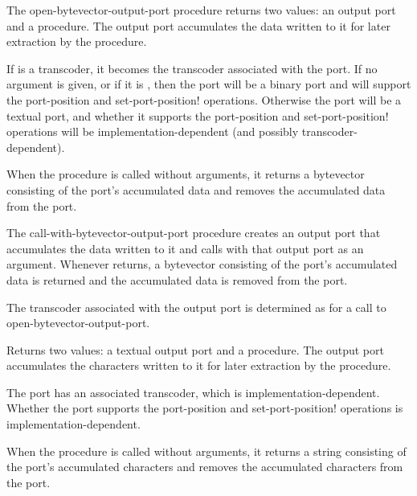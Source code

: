 \begin{entry}{%
}


The {\cf open-bytevector-output-port} procedure returns 
two values: an output port and a procedure.
The output port accumulates the data written to it for
later extraction by the procedure.

If  is a transcoder, it becomes
the transcoder associated with the port.
If no  argument is given, or
if it is \schfalse,
then the port will be a binary port and will support the
{\cf port-position} and {\cf set-port-position!}  operations.
Otherwise the port will be a textual port, and whether it supports
the {\cf port-position} and {\cf set-port-position!} operations
will be implementation-dependent (and possibly transcoder-dependent).

When the procedure is called without arguments, it returns a bytevector consisting of the
port's accumulated data and removes the accumulated data from the port.
\end{entry}

\begin{entry}{%
}


The {\cf call-with-bytevector-output-port} procedure creates an output
port that accumulates the data written to it and calls  with
that output port as an argument. Whenever  returns, a
bytevector consisting of the port's accumulated data is returned and
the accumulated data is removed from the port.

The transcoder associated with the output port is determined
as for a call to {\cf open-bytevector-output-port}.
\end{entry}

\begin{entry}{%
}

Returns two values: a textual output port and a procedure.
The output port accumulates the characters written to it for
later extraction by the procedure.

The port has an associated transcoder, which is implementation-dependent.
Whether the port supports
the {\cf port-position} and {\cf set-port-position!} operations
is implementation-dependent.

When the procedure is called without arguments, it returns a string consisting of the port's
accumulated characters and removes the accumulated characters from the port.
\end{entry}

